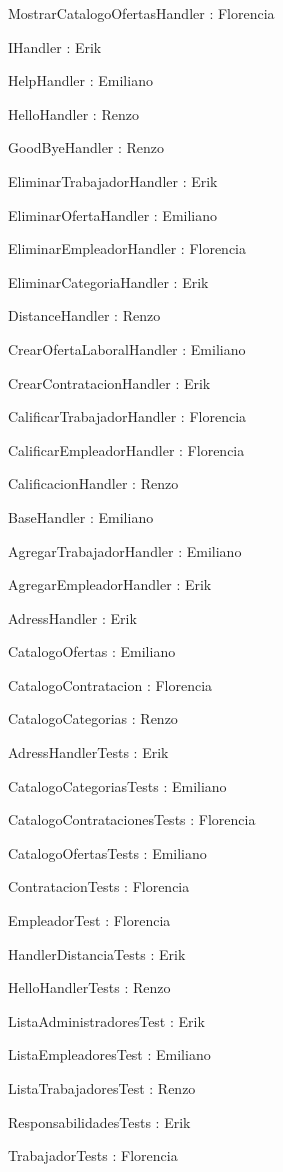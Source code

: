 \begin{DoxyItemize}
\item Mostrar\+Catalogo\+Ofertas\+Handler \+: Florencia
\item IHandler \+: Erik
\item Help\+Handler \+: Emiliano
\item Hello\+Handler \+: Renzo
\item Good\+Bye\+Handler \+: Renzo
\item Eliminar\+Trabajador\+Handler \+: Erik
\item Eliminar\+Oferta\+Handler \+: Emiliano
\item Eliminar\+Empleador\+Handler \+: Florencia
\item Eliminar\+Categoria\+Handler \+: Erik
\item Distance\+Handler \+: Renzo
\item Crear\+Oferta\+Laboral\+Handler \+: Emiliano
\item Crear\+Contratacion\+Handler \+: Erik
\item Calificar\+Trabajador\+Handler \+: Florencia
\item Calificar\+Empleador\+Handler \+: Florencia
\item Calificacion\+Handler \+: Renzo
\item Base\+Handler \+: Emiliano
\item Agregar\+Trabajador\+Handler \+: Emiliano
\item Agregar\+Empleador\+Handler \+: Erik
\item Adress\+Handler \+: Erik
\item Catalogo\+Ofertas \+: Emiliano
\item Catalogo\+Contratacion \+: Florencia
\item Catalogo\+Categorias \+: Renzo
\item Adress\+Handler\+Tests \+: Erik
\item Catalogo\+Categorias\+Tests \+: Emiliano
\item Catalogo\+Contrataciones\+Tests \+: Florencia
\item Catalogo\+Ofertas\+Tests \+: Emiliano
\item Contratacion\+Tests \+: Florencia
\item Empleador\+Test \+: Florencia
\item Handler\+Distancia\+Tests \+: Erik
\item Hello\+Handler\+Tests \+: Renzo
\item Lista\+Administradores\+Test \+: Erik
\item Lista\+Empleadores\+Test \+: Emiliano
\item Lista\+Trabajadores\+Test \+: Renzo
\item Responsabilidades\+Tests \+: Erik
\item Trabajador\+Tests \+: Florencia
\end{DoxyItemize}

